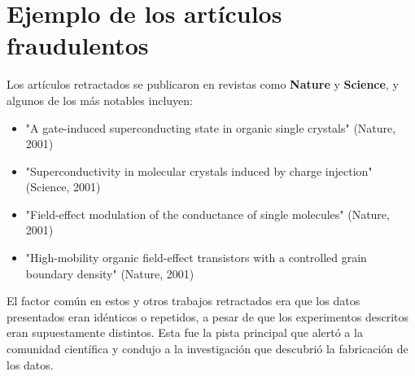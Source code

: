 \documentclass{article}
\begin{document}
\section*{Ejemplo de los artículos fraudulentos}

Los artículos retractados se publicaron en revistas como \textbf{Nature}
y \textbf{Science}, y algunos de los más notables incluyen:

\begin{itemize}
  \item "A gate-induced superconducting state in organic single crystals" (Nature, 2001)
  \item "Superconductivity in molecular crystals induced by charge injection" (Science, 2001)
  \item "Field-effect modulation of the conductance of single molecules" (Nature, 2001)
  \item "High-mobility organic field-effect transistors with a controlled grain boundary density" (Nature, 2001)
\end{itemize}

El factor común en estos y otros trabajos retractados era que los datos
presentados eran idénticos o repetidos, a pesar de que los experimentos
descritos eran supuestamente distintos. Esta fue la pista principal que
alertó a la comunidad científica y condujo a la investigación que descubrió
la fabricación de los datos.
\end{document}
